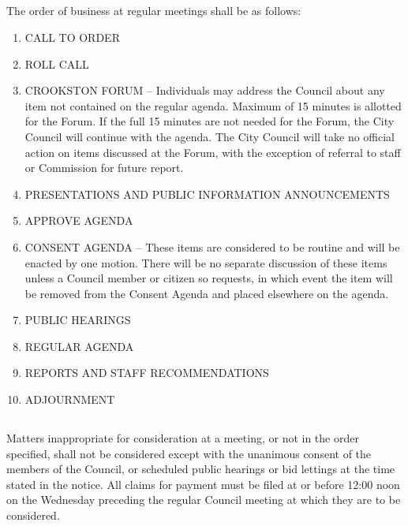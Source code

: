 \subsection{}
The order of business at regular meetings shall be as follows:
\begin{enumerate}[{\indent}1)]
    \item CALL TO ORDER
    \item ROLL CALL
    \item CROOKSTON FORUM -- Individuals may address the Council about any item not contained on the regular agenda.   Maximum of 15 minutes is allotted for the Forum.  If the full 15 minutes are not needed for the Forum, the City Council will continue with the agenda.  The City Council will take no official action on items discussed at the Forum, with the exception of referral to staff or Commission for future report.
    \item PRESENTATIONS AND PUBLIC INFORMATION ANNOUNCEMENTS
    \item APPROVE AGENDA
    \item CONSENT AGENDA -- These items are considered to be routine and will be enacted by one motion.  There will be no separate discussion of these items unless a Council member or citizen so requests, in which event the item will be removed from the Consent Agenda and placed elsewhere on the agenda.
    \item PUBLIC HEARINGS
    \item REGULAR AGENDA
    \item REPORTS AND STAFF RECOMMENDATIONS
    \item ADJOURNMENT
\end{enumerate}
\subsection{}
Matters inappropriate for consideration at a meeting, or not in the order specified, shall not be considered except with the unanimous consent of the members of the Council, or scheduled public hearings or bid lettings at the time stated in the notice.  All claims for payment must be filed at or before 12:00 noon on the Wednesday preceding the regular Council meeting at which they are to be considered.

